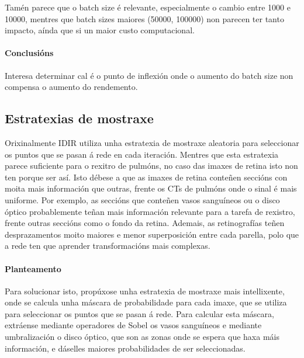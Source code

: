 Tamén parece que o batch size é relevante, especialmente o cambio entre 1000 e 10000, mentres que batch sizes maiores (50000, 100000) non parecen ter tanto impacto, aínda que si un maior custo computacional.

\paragraph{Conclusións}
\label{par:Conclusions-batchsize}

Interesa determinar cal é o punto de inflexión onde o aumento do batch size non compensa o aumento do rendemento.

\subsection{Estratexias de mostraxe}
\label{subsec:Estratexias de mostraxe}

Orixinalmente IDIR utiliza unha estratexia de mostraxe aleatoria para seleccionar os puntos que se pasan á rede en cada iteración.
Mentres que esta estratexia parece suficiente para o rexitro de pulmóns, no caso das imaxes de retina isto non ten porque ser así.
Isto débese a que as imaxes de retina conteñen seccións con moita mais información que outras, frente os CTs de pulmóns onde o sinal é mais uniforme.
Por exemplo, as seccións que conteñen vasos sanguíneos ou o disco óptico probablemente teñan mais información relevante para a tarefa de rexistro, frente outras seccións como o fondo da retina.
Ademais, as retinografías teñen desprazamentos moito maiores e menor superposición entre cada parella, polo que a rede ten que aprender transformacións mais complexas.

\paragraph{Planteamento}
\label{par:Planteamento-sampling}

Para solucionar isto, propúxose unha estratexia de mostraxe mais intellixente, onde se calcula unha máscara de probabilidade para cada imaxe, que se utiliza para seleccionar os puntos que se pasan á rede.
Para calcular esta máscara, extráense mediante operadores de Sobel os vasos sanguíneos e mediante umbralización o disco óptico, que son as zonas onde se espera que haxa máis información, e dáselles maiores probabilidades de ser seleccionadas.

